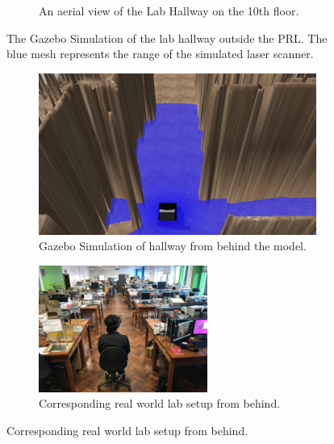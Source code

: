 \begin{figure}[ht]
\begin{subfigure}[b]{.48\textwidth}
        \caption{An aerial view of the Lab Hallway on the 10th floor.}
    \end{subfigure}
    \vspace{-1\baselineskip}
    \begin{center}
        \caption{The Gazebo Simulation of the lab hallway outside the PRL. The blue mesh represents the range of the simulated laser scanner.}
        \label{fig:greenredrender}
    \end{center}
    \vspace{-1\baselineskip}
\end{figure}

\begin{figure}[ht!]
    \begin{subfigure}[b]{.48\textwidth}
        \centering
        \includegraphics[width=1.0\linewidth]{img/chapter6_test/gazeboBack.jpg}
        \caption{Gazebo Simulation of hallway from behind the model.}
    \end{subfigure}%
    \hspace{\fill} 
    \begin{subfigure}[b]{.48\textwidth}
        \centering
        \includegraphics[width=1.0\linewidth,height=41.5mm]{img/chapter6_test/realBack.jpg}
        \caption{Corresponding real world lab setup from behind.}
    \end{subfigure}


\end{figure}
